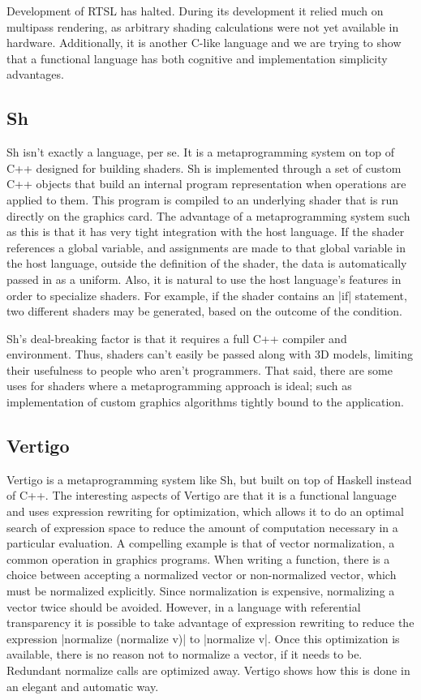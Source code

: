 \documentclass{acmsiggraph}               %
\begin{document}
Development of RTSL has halted.  During its development it relied much
on multipass rendering, as arbitrary shading calculations were not yet
available in hardware.  Additionally, it is another C-like language
and we are trying to show that a functional language has both
cognitive and implementation simplicity advantages.


\subsection{Sh}

Sh \cite{mccool02shader} isn't exactly a language, per se.  It is a
metaprogramming system on top of C++ designed for building shaders.
Sh is implemented through a set of custom C++ objects that build an
internal program representation when operations are applied to them.
This program is compiled to an underlying shader that is run directly
on the graphics card.  The advantage of a metaprogramming system such
as this is that it has very tight integration with the host
language. If the shader references a global variable, and assignments
are made to that global variable in the host language, outside the
definition of the shader, the data is automatically passed in as a
uniform.  Also, it is natural to use the host language's features in
order to specialize shaders.  For example, if the shader contains an
|if| statement, two different shaders may be generated, based on the
outcome of the condition.

Sh's deal-breaking factor is that it requires a full C++ compiler and
environment.  Thus, shaders can't easily be passed along with 3D
models, limiting their usefulness to people who aren't programmers.
That said, there are some uses for shaders where a metaprogramming
approach is ideal; such as implementation of custom graphics
algorithms tightly bound to the application.


\subsection{Vertigo}

Vertigo \cite{elliott04vertigo} is a metaprogramming system like Sh,
but built on top of Haskell instead of C++.  The interesting aspects
of Vertigo are that it is a functional language and uses expression
rewriting for optimization, which allows it to do an optimal search of
expression space to reduce the amount of computation necessary in a
particular evaluation.  A compelling example is that of vector
normalization, a common operation in graphics programs.  When writing
a function, there is a choice between accepting a normalized vector or
non-normalized vector, which must be normalized explicitly.  Since
normalization is expensive, normalizing a vector twice should be
avoided.  However, in a language with referential transparency it is
possible to take advantage of expression rewriting to reduce the
expression |normalize (normalize v)| to |normalize v|.  Once this
optimization is available, there is no reason not to normalize a
vector, if it needs to be.  Redundant normalize calls are optimized
away.  Vertigo shows how this is done in an elegant and automatic way.
\end{document}
